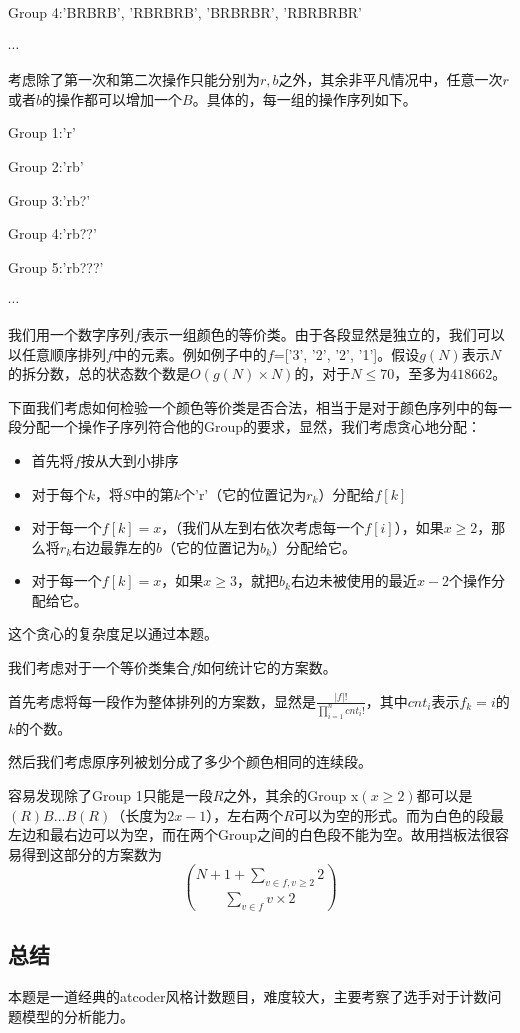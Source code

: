 \documentclass[12pt]{article}
\begin{document}
Group 4:'BRBRB', 'RBRBRB', 'BRBRBR', 'RBRBRBR'

$\cdots$

考虑除了第一次和第二次操作只能分别为$r,b$之外，其余非平凡情况中，任意一次$r$或者$b$的操作都可以增加一个$B$。具体的，每一组的操作序列如下。

Group 1:'r'

Group 2:'rb'

Group 3:'rb?'

Group 4:'rb??'

Group 5:'rb???'

$\cdots$

我们用一个数字序列$f$表示一组颜色的等价类。由于各段显然是独立的，我们可以以任意顺序排列$f$中的元素。例如例子中的$f$=['3', '2', '2', '1']。假设$g(N)$表示$N$的拆分数，总的状态数个数是$O(g(N)\times N)$的，对于$N\le 70$，至多为$418662$。

下面我们考虑如何检验一个颜色等价类是否合法，相当于是对于颜色序列中的每一段分配一个操作子序列符合他的Group的要求，显然，我们考虑贪心地分配：
\begin{itemize}
  \item 首先将$f$按从大到小排序
  \item 对于每个$k$，将$S$中的第$k$个'r'（它的位置记为$r_k$）分配给$f[k]$
  \item 对于每一个$f[k]=x$，（我们从左到右依次考虑每一个$f[i]$），如果$x\ge 2$，那么将$r_k$右边最靠左的$b$（它的位置记为$b_k$）分配给它。
  \item 对于每一个$f[k]=x$，如果$x\ge 3$，就把$b_k$右边未被使用的最近$x-2$个操作分配给它。
\end{itemize}

这个贪心的复杂度足以通过本题。

我们考虑对于一个等价类集合$f$如何统计它的方案数。

首先考虑将每一段作为整体排列的方案数，显然是$\frac{|f|!}{\prod_{i=1}^{n}cnt_i!}$，其中$cnt_i$表示$f_k=i$的$k$的个数。

然后我们考虑原序列被划分成了多少个颜色相同的连续段。

容易发现除了Group 1只能是一段$R$之外，其余的Group x$(x \ge 2)$都可以是$(R)B...B(R)$（长度为$2x-1$），左右两个$R$可以为空的形式。而为白色的段最左边和最右边可以为空，而在两个Group之间的白色段不能为空。故用挡板法很容易得到这部分的方案数为
$$
\binom{N + 1 + \sum_{v\in f, v\ge 2} 2}{\sum_{v\in f} v\times 2}
$$

\subsection{总结}
本题是一道经典的atcoder风格计数题目，难度较大，主要考察了选手对于计数问题模型的分析能力。
\end{document}
